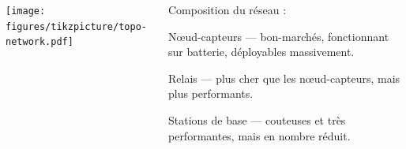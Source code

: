 \documentclass[../main.tex]{subfiles}
\begin{document}
\begin{frame}{}

  \begin{columns}
    \begin{column}{.5\linewidth}
      \texttt{[image: figures/tikzpicture/topo-network.pdf]}
    \end{column}
    \begin{column}{.5\linewidth}
      Composition du réseau :

      \begin{ctrlitemize}{2pt}
        \item \textcolor{RoyalBlue3}{Nœud-capteurs   } --- bon-marchés, fonctionnant sur batterie, déployables massivement.
        \item \textcolor{Chartreuse3}{Relais          } --- plus cher que les nœud-capteurs, mais plus performants.
        \item \textcolor{Gold3}{Stations de base} --- couteuses et très performantes, mais en nombre réduit.
      \end{ctrlitemize}
    \end{column}
  \end{columns}
\end{frame}
\end{document}
